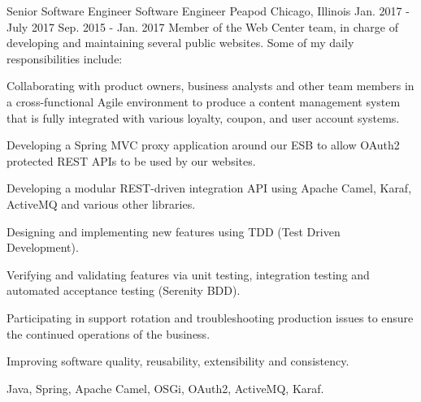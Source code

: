 \begin{cventries}
  \experienceentryextra
    {Senior Software Engineer} %
    {Software Engineer} %
    {Peapod} %
    {Chicago, Illinois} %
    {Jan. 2017 - July 2017} %
    {Sep. 2015 - Jan. 2017} %
    {Member of the Web Center team, in charge of developing and maintaining several public websites. Some of my daily responsibilities include:
    } %
    {
    	\begin{cvitems}
  		\item Collaborating with product owners, business analysts and other team members in a cross-functional Agile environment to produce a content management system that is fully integrated with various loyalty, coupon, and user account systems.
  		\item Developing a Spring MVC proxy application around our ESB to allow OAuth2 protected REST APIs to be used by our websites.
  		\item Developing a modular REST-driven integration API using Apache Camel, Karaf, ActiveMQ and various other libraries.
  		\item Designing and implementing new features using TDD (Test Driven Development).
  		\item Verifying and validating features via unit testing, integration testing and automated acceptance testing (Serenity BDD).
  		\item Participating in support rotation and troubleshooting production issues to ensure the continued operations of the business.
  		\item Improving software quality, reusability, extensibility and consistency.
	\end{cvitems} 
    }
    {Java, Spring, Apache Camel, OSGi, OAuth2, ActiveMQ, Karaf.}
    
  

\end{cventries}
